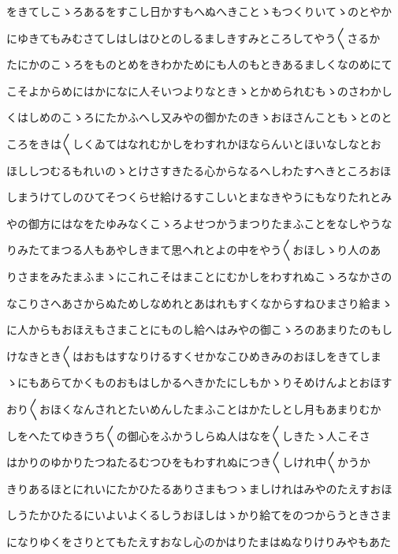 \documentclass[a4paper,11pt,landscape]{ltjtarticle}
\begin{document}
\par\medskip
をきてしこゝろあるをすこし日かすもへぬへきことゝもつくりいてゝのとやか
\par\medskip
にゆきてもみむさてしはしはひとのしるましきすみところしてやう〱さるか
\par\medskip
たにかのこゝろをものとめをきわかためにも人のもときあるましくなのめにて
\par\medskip
こそよからめにはかになに人そいつよりなときゝとかめられむもゝのさわかし
\par\medskip
くはしめのこゝろにたかふへし又みやの御かたのきゝおほさんこともゝとのと
\par\medskip
ころをきは〱しくゐてはなれむかしをわすれかほならんいとほいなしなとお
\par\medskip
ほししつむるもれいのゝとけさすきたる心からなるへしわたすへきところおほ
\par\medskip
しまうけてしのひてそつくらせ給けるすこしいとまなきやうにもなりたれとみ
\par\medskip
やの御方にはなをたゆみなくこゝろよせつかうまつりたまふことをなしやうな
\par\medskip
りみたてまつる人もあやしきまて思へれとよの中をやう〱おほしゝり人のあ
\par\medskip
りさまをみたまふまゝにこれこそはまことにむかしをわすれぬこゝろなかさの
\par\medskip
なこりさへあさからぬためしなめれとあはれもすくなからすねひまさり給まゝ
\par\medskip
に人からもおほえもさまことにものし給へはみやの御こゝろのあまりたのもし
\par\medskip
けなきとき〱はおもはすなりけるすくせかなこひめきみのおほしをきてしま
\par\medskip
ゝにもあらてかくものおもはしかるへきかたにしもかゝりそめけんよとおほす
\par\medskip
おり〱おほくなんされとたいめんしたまふことはかたしとし月もあまりむか
\par\medskip
しをへたてゆきうち〱の御心をふかうしらぬ人はなを〱しきたゝ人こそさ
\par\medskip
はかりのゆかりたつねたるむつひをもわすれぬにつき〱しけれ中〱かうか
\par\medskip
きりあるほとにれいにたかひたるありさまもつゝましけれはみやのたえすおほ
\par\medskip
しうたかひたるにいよいよくるしうおほしはゝかり給てをのつからうときさま
\par\medskip
になりゆくをさりとてもたえすおなし心のかはりたまはぬなりけりみやもあた
\par\medskip
\end{document}
